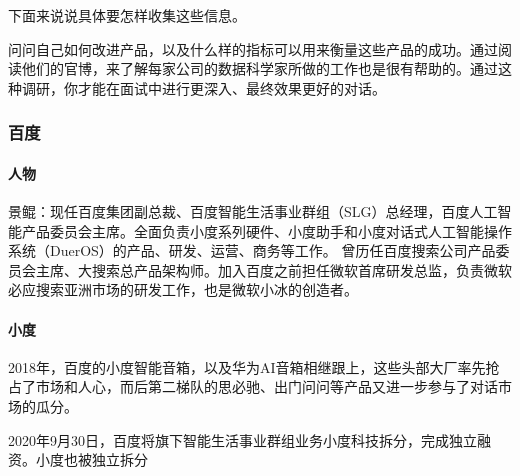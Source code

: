 \documentclass[letterpaper,10pt,english]{sphinxmanual}
\begin{document}
下面来说说具体要怎样收集这些信息。%
\begin{footnote}[983]\sphinxAtStartFootnote
{}
%
\end{footnote}

问问自己如何改进产品，以及什么样的指标可以用来衡量这些产品的成功。通过阅读他们的官博，来了解每家公司的数据科学家所做的工作也是很有帮助的。通过这种调研，你才能在面试中进行更深入、最终效果更好的对话。
%
\begin{footnote}[984]\sphinxAtStartFootnote
{}
%
\end{footnote}


\subsubsection{百度}
\label{\detokenize{chapter_AI_company/baidu:id1}}\label{\detokenize{chapter_AI_company/baidu::doc}}

\paragraph{人物}
\label{\detokenize{chapter_AI_company/baidu:id2}}
景鲲：现任百度集团副总裁、百度智能生活事业群组（SLG）总经理，百度人工智能产品委员会主席。全面负责小度系列硬件、小度助手和小度对话式人工智能操作系统（DuerOS）的产品、研发、运营、商务等工作。
曾历任百度搜索公司产品委员会主席、大搜索总产品架构师。加入百度之前担任微软首席研发总监，负责微软必应搜索亚洲市场的研发工作，也是微软小冰的创造者。%
\begin{footnote}[985]\sphinxAtStartFootnote
{}
%
\end{footnote}


\paragraph{小度}
\label{\detokenize{chapter_AI_company/baidu:id3}}
2018年，百度的小度智能音箱，以及华为AI音箱相继跟上，这些头部大厂率先抢占了市场和人心，而后第二梯队的思必驰、出门问问等产品又进一步参与了对话市场的瓜分。

2020年9月30日，百度将旗下智能生活事业群组业务小度科技拆分，完成独立融资。小度也被独立拆分%
\begin{footnote}[986]\sphinxAtStartFootnote
{}
%
\end{footnote}
\end{document}
